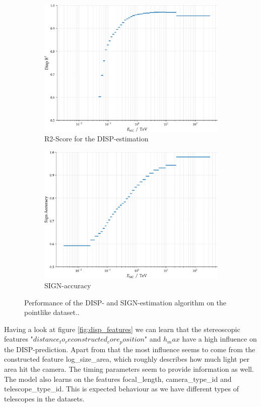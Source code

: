 \begin{figure}
    \begin{subfigure}{0.45\textwidth}
        \includegraphics[width=0.9\linewidth]{../analysis/plots/disp_gamma_r2_equal_filled.pdf} 
        \caption{R2-Score for the DISP-estimation}
    \end{subfigure}
    \begin{subfigure}{0.45\textwidth}
        \includegraphics[width=0.9\linewidth]{../analysis/plots/disp_gamma_acc_equal_filled.pdf}
        \caption{SIGN-accuracy}
    \end{subfigure}
    \caption{Performance of the DISP- and SIGN-estimation algorithm on the pointlike dataset..}
    \label{fig:disp_gamma_perf_2}
\end{figure}


Having a look at figure \ref{fig:disp_features} we can learn that 
the stereoscopic features "$distance_to_reconstructed_core_position$"
and $h_max$ have a high influence on the DISP-prediction.
Apart from that the most influence seems to come from the constructed 
feature log\_size\_area, which roughly describes how much light per 
area hit the camera. The timing parameters seem to provide information as 
well. The model also learns on the features focal\_length,  
camera\_type\_id and telescope\_type\_id. This is expected 
behaviour as we have different types of telescopes in the datasets.

